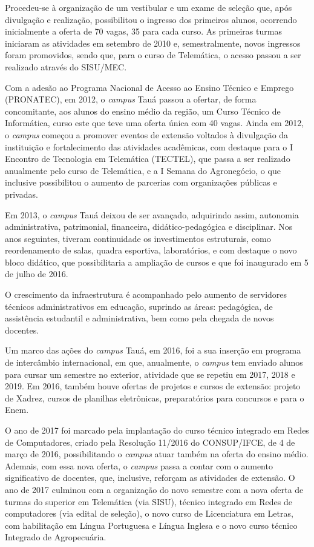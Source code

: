 Procedeu-se à organização de um vestibular e um exame de seleção que, após divulgação e realização, possibilitou o ingresso dos primeiros alunos, ocorrendo inicialmente a oferta de 70 vagas, 35 para cada curso. As primeiras turmas iniciaram as atividades em setembro de 2010 e, semestralmente, novos ingressos foram promovidos, sendo que, para o curso de Telemática, o acesso passou a ser realizado através do SISU/MEC.

Com a adesão ao Programa Nacional de Acesso ao Ensino Técnico e Emprego (PRONATEC), em 2012, o \textit{campus} Tauá passou a ofertar, de forma concomitante, aos alunos do ensino médio da região, um Curso Técnico de Informática, curso este que teve uma oferta única com 40 vagas. Ainda em 2012, o \textit{campus} começou a promover eventos de extensão voltados à divulgação da instituição e fortalecimento das atividades acadêmicas, com destaque para o I Encontro de Tecnologia em Telemática (TECTEL), que passa a ser realizado anualmente pelo curso de Telemática, e a I Semana do Agronegócio, o que inclusive possibilitou o aumento de parcerias com organizações públicas e privadas.

Em 2013, o \textit{campus} Tauá deixou de ser avançado, adquirindo assim, autonomia administrativa, patrimonial, financeira, didático-pedagógica e disciplinar. Nos anos seguintes, tiveram continuidade os investimentos estruturais, como reordenamento de salas, quadra esportiva, laboratórios, e com destaque o novo bloco didático, que possibilitaria a ampliação de cursos e que foi inaugurado em 5 de julho de 2016.

O crescimento da infraestrutura é acompanhado pelo aumento de servidores técnicos administrativos em educação, suprindo as áreas: pedagógica, de assistência estudantil e administrativa, bem como pela chegada de novos docentes.

Um marco das ações do \textit{campus} Tauá, em 2016, foi a sua inserção em programa de intercâmbio internacional, em que, anualmente, o  \textit{campus} tem enviado alunos para cursar um semestre no exterior, atividade que se repetiu em 2017, 2018 e 2019. Em 2016, também houve ofertas de projetos e cursos de extensão: projeto de Xadrez, cursos de planilhas eletrônicas, preparatórios para concursos e para o Enem.

O ano de 2017 foi marcado pela implantação do curso técnico integrado em Redes de Computadores, criado pela Resolução 11/2016 do CONSUP/IFCE, de 4 de março de 2016, possibilitando o \textit{campus} atuar também na oferta do ensino médio. Ademais, com essa nova oferta, o \textit{campus} passa a contar com o aumento significativo de docentes, que, inclusive, reforçam as atividades de extensão. O ano de 2017 culminou com a organização do novo semestre com a nova oferta de turmas do superior em Telemática (via SISU), técnico integrado em Redes de computadores (via edital de seleção), o novo curso de Licenciatura em Letras, com habilitação em Língua Portuguesa e Língua Inglesa e o novo curso técnico Integrado de Agropecuária.


